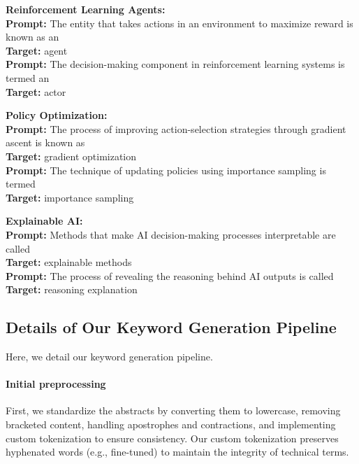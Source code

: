 \documentclass[10pt]{article}
\begin{document}
\begin{center}
\label{fig:claude}
\vspace*{0cm}
\begin{tcolorbox}[title=Prompts and Targets for Keywords from \texttt{CS.AI}, boxsep=10pt, left=0pt, right=0pt, top=0pt, bottom=0pt]
\textbf{Reinforcement Learning Agents:}\\
\textbf{Prompt:} The entity that takes actions in an environment to maximize reward is known as an\\
\textbf{Target:} agent\\
\textbf{Prompt:} The decision-making component in reinforcement learning systems is termed an\\
\textbf{Target:} actor \vspace*{.25cm}

\textbf{Policy Optimization:}\\
\textbf{Prompt:} The process of improving action-selection strategies through gradient ascent is known as\\
\textbf{Target:} gradient optimization\\
\textbf{Prompt:} The technique of updating policies using importance sampling is termed\\
\textbf{Target:} importance sampling \vspace*{.25cm}

\textbf{Explainable AI:}\\
\textbf{Prompt:} Methods that make AI decision-making processes interpretable are called\\
\textbf{Target:} explainable methods\\
\textbf{Prompt:} The process of revealing the reasoning behind AI outputs is called\\
\textbf{Target:} reasoning explanation
\end{tcolorbox}
\end{center}



\subsection{Details of Our Keyword Generation Pipeline}
\label{subsec:keyword-creation-detailed}
Here, we detail our keyword generation pipeline.

\paragraph{Initial preprocessing} First, we standardize the abstracts by converting them to lowercase, removing bracketed content, handling apostrophes and contractions, and implementing custom tokenization to ensure consistency. Our custom tokenization preserves hyphenated words (e.g., fine-tuned) to maintain the integrity of technical terms. 
\end{document}
